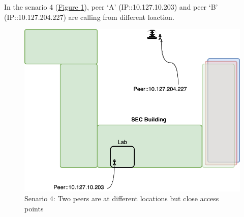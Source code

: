 	In the senario 4 (\hyperref[fig:scene-4]{Figure \ref{fig:scene-4}}), peer `A' (IP::10.127.10.203) and peer `B' (IP::10.127.204.227) are calling from different loaction.
	\begin{figure}[thb]
		\begin{minipage}{\textwidth}
			\includegraphics[scale=0.29]{Images/experiment/senarios/near_fountain.drawio.png}
		\end{minipage}
		\caption{Senario 4: Two peers are at different locations but close access points}
		\label{fig:scene-4}
	\end{figure}

